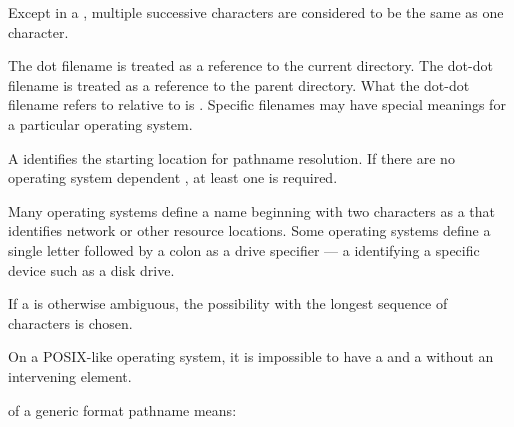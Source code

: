 \pnum
Except in a ,
multiple successive  characters are considered to
be the same as one  character.

\pnum
The dot filename is treated as a reference to the current directory.
The dot-dot filename is treated as a reference to the parent directory.
What the dot-dot filename refers to
relative to  is .
Specific filenames may have special meanings for a particular operating system.

\pnum
A  identifies the
starting location for pathname resolution.
If there are no operating system dependent ,
at least one \impldefrootname{}  is required.
\begin{note}
Many operating systems define a name
beginning with two  characters
as a  that identifies
network or other resource locations.
Some operating systems
define a single letter followed by a colon
as a drive specifier --- a 
identifying a specific device such as a disk drive.
\end{note}

\pnum
If a  is otherwise ambiguous,
the possibility with the longest sequence of characters is chosen.
\begin{note}
On a POSIX-like operating system, it is impossible to have a
 and a 
without an intervening  element.
\end{note}

\pnum
{}%
 of a generic format pathname means:

